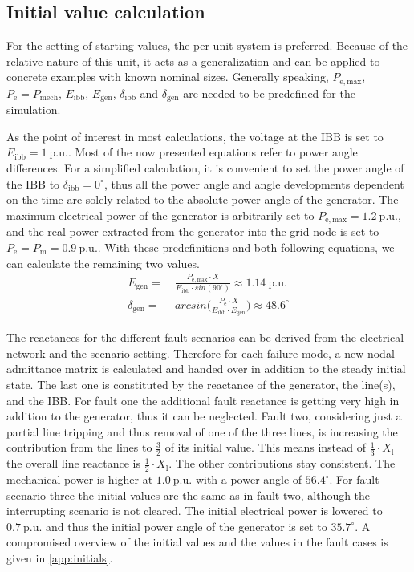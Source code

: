 \subsection{Initial value calculation}
\label{sec:initials}

For the setting of starting values, the per-unit system is preferred. Because of the relative nature of this unit, it acts as a generalization and can be applied to concrete examples with known nominal sizes. Generally speaking, $P_\mathrm{e,max}$, $P_\mathrm{e}=P_\mathrm{mech}$, $E_\mathrm{ibb}$, $E_\mathrm{gen}$, $\delta_\mathrm{ibb}$ and $\delta_\mathrm{gen}$ are needed to be predefined for the simulation. 

As the point of interest in most calculations, the voltage at the \acs{IBB} is set to $E_\mathrm{ibb}=1~\mathrm{p.u.}$. Most of the now presented equations refer to power angle differences. For a simplified calculation, it is convenient to set the power angle of the \acs{IBB} to $\delta_\mathrm{ibb}=0^\circ$, thus all the power angle and angle developments dependent on the time are solely related to the absolute power angle of the generator. The maximum electrical power of the generator is arbitrarily set to $P_\mathrm{e,max}=1.2~\mathrm{p.u.}$, and the real power extracted from the generator into the grid node is set to $P_\mathrm{e}=P_\mathrm{m}=0.9~\mathrm{p.u.}$. With these predefinitions and both following equations, we can calculate the remaining two values.
\begin{align}
        E_\mathrm{gen}=&~\frac{P_\mathrm{e,max} \cdot X}{E_\mathrm{ibb} \cdot sin(90^\circ)} \approx 1.14~\mathrm{p.u.} \nonumber \\[6pt]
        \delta_\mathrm{gen}=&~arcsin\Bigg(\frac{P_\mathrm{e} \cdot X}{E_\mathrm{ibb} \cdot E_\mathrm{gen}}\Bigg) \approx 48.6^\circ \nonumber
\end{align}

The reactances for the different fault scenarios can be derived from the electrical network and the scenario setting. Therefore for each failure mode, a new nodal admittance matrix is calculated and handed over in addition to the steady initial state. The last one is constituted by the reactance of the generator, the line(s), and the \acs{IBB}. For fault one the additional fault reactance is getting very high in addition to the generator, thus it can be neglected. Fault two, considering just a partial line tripping and thus removal of one of the three lines, is increasing the contribution from the lines to $\frac{3}{2}$ of its initial value. This means instead of $\frac{1}{3} \cdot X_\mathrm{l}$ the overall line reactance is $\frac{1}{2} \cdot X_\mathrm{l}$. The other contributions stay consistent. The mechanical power is higher at $1.0~\mathrm{p.u.}$ with a power angle of $56.4^\circ$. For fault scenario three the initial values are the same as in fault two, although the interrupting scenario is not cleared. The initial electrical power is lowered to $0.7~\mathrm{p.u.}$ and thus the initial power angle of the generator is set to $35.7^\circ$. A compromised overview of the initial values and the values in the fault cases is given in \autoref{app:initials}.


